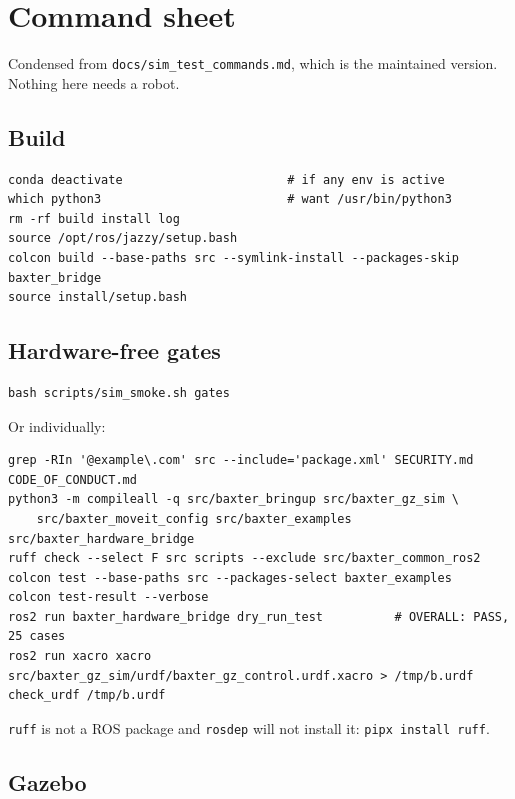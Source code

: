 \chapter{Command sheet}
\label{app:commands}

Condensed from \texttt{docs/sim\_test\_commands.md}, which is the maintained
version. Nothing here needs a robot.

\section{Build}

\begin{lstlisting}
conda deactivate                       # if any env is active
which python3                          # want /usr/bin/python3
rm -rf build install log
source /opt/ros/jazzy/setup.bash
colcon build --base-paths src --symlink-install --packages-skip baxter_bridge
source install/setup.bash
\end{lstlisting}

\section{Hardware-free gates}

\begin{lstlisting}
bash scripts/sim_smoke.sh gates
\end{lstlisting}

Or individually:

\begin{lstlisting}
grep -RIn '@example\.com' src --include='package.xml' SECURITY.md CODE_OF_CONDUCT.md
python3 -m compileall -q src/baxter_bringup src/baxter_gz_sim \
    src/baxter_moveit_config src/baxter_examples src/baxter_hardware_bridge
ruff check --select F src scripts --exclude src/baxter_common_ros2
colcon test --base-paths src --packages-select baxter_examples
colcon test-result --verbose
ros2 run baxter_hardware_bridge dry_run_test          # OVERALL: PASS, 25 cases
ros2 run xacro xacro src/baxter_gz_sim/urdf/baxter_gz_control.urdf.xacro > /tmp/b.urdf
check_urdf /tmp/b.urdf
\end{lstlisting}

\texttt{ruff} is not a ROS package and \texttt{rosdep} will not install it:
\texttt{pipx install ruff}.

\section{Gazebo}


